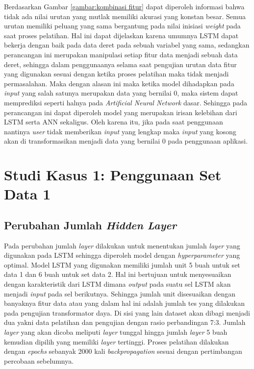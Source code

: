 Berdasarkan Gambar \ref{gambar:kombinasi fitur} dapat diperoleh informasi bahwa tidak ada nilai urutan yang mutlak memiliki akurasi yang konstan besar. Semua urutan memiliki peluang yang sama bergantung pada nilai inisiasi \textit{weight} pada saat proses pelatihan. Hal ini dapat dijelaskan karena umumnya LSTM dapat bekerja dengan baik pada data deret pada sebuah variabel yang sama, sedangkan perancangan ini merupakan manipulasi setiap fitur data menjadi sebuah data deret, sehingga dalam penggunaanya selama saat pengujian urutan data fitur yang digunakan sesuai dengan ketika proses pelatihan maka tidak menjadi permasalahan. Maka dengan alasan ini maka ketika model dihadapkan pada \textit{input} yang salah satunya merupakan data yang bernilai 0, maka sistem dapat memprediksi seperti halnya pada \textit{Artificial Neural Network} dasar. Sehingga pada perancangan ini dapat diperoleh model yang merupakan irisan kelebihan dari LSTM serta ANN sekaligus. Oleh karena itu, jika pada saat penggunaan nantinya \textit{user} tidak memberikan \textit{input} yang lengkap maka \textit{input} yang kosong akan di transformasikan menjadi data yang bernilai 0 pada penggunaan aplikasi.
\section{Studi Kasus 1: Penggunaan Set Data 1}
\subsection{Perubahan Jumlah \textit{Hidden Layer}}
Pada perubahan jumlah \textit{layer} dilakukan untuk menentukan jumlah \textit{layer} yang digunakan pada LSTM sehingga diperoleh model dengan \textit{hyperparameter }yang optimal. Model LSTM yang digunakan memiliki jumlah unit 5 buah untuk set data 1 dan 6 buah untuk set data 2. Hal ini bertujuan untuk menyesuaikan dengan karakteristik dari LSTM dimana \textit{output} pada suatu sel LSTM akan menjadi \textit{input} pada sel berikutnya. Sehingga jumlah unit disesuaikan dengan banyaknya fitur data atau yang dalam hal ini adalah jumlah tes yang dilakukan pada pengujian transformator daya. Di sisi yang lain dataset akan dibagi menjadi dua yakni data pelatihan dan pengujian dengan rasio perbandingan 7:3. Jumlah \textit{layer} yang akan dicoba meliputi \textit{layer} tunggal hingga jumlah \textit{layer} 5 buah kemudian dipilih yang memiliki \textit{layer} tertinggi. Proses pelatihan dilakukan dengan \textit{epochs} sebanyak 2000 kali \textit{backpropagation} sesuai dengan pertimbangan percobaan sebelumnya.


